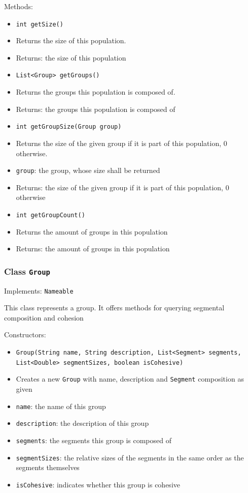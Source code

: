 \documentclass[parskip=full,11pt]{scrartcl}
\begin{document}
Methods:
\begin{itemize}\itemsep -10pt
\item \texttt{int getSize()}
\item[] Returns the size of this population.
\item[] Returns: the size of this population

\item \texttt{List<Group> getGroups()}
\item[] Returns the groups this population is composed of.
\item[] Returns: the groups this population is composed of

\item \texttt{int getGroupSize(Group group)}
\item[] Returns the size of the given group if it is part of this population, \(0\) otherwise.
\item[] \texttt{group}: the group, whose size shall be returned
\item[] Returns: the size of the given group if it is part of this population, \(0\) otherwise

\item \texttt{int getGroupCount()}
\item[] Returns the amount of groups in this population
\item[] Returns: the amount of groups in this population
\end{itemize}

\subsubsection{Class \texttt{Group}}
Implements: \texttt{Nameable}

This class represents a group. It offers methods for querying segmental composition and cohesion

Constructors:
\begin{itemize}\itemsep -10pt
\item \texttt{Group(String name, String description, List<Segment> segments, List<Double> segmentSizes, boolean isCohesive)}
\item[] Creates a new \texttt{Group} with name, description and \texttt{Segment} composition as given
\item[] \texttt{name}: the name of this group
\item[] \texttt{description}: the description of this group
\item[] \texttt{segments}: the segments this group is composed of
\item[] \texttt{segmentSizes}: the relative sizes of the segments in the same order as the segments themselves
\item[] \texttt{isCohesive}: indicates whether this group is cohesive
\end{itemize}
\end{document}
